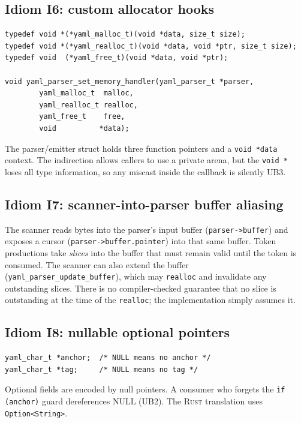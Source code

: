 \documentclass[12pt]{article}
\newcommand{\rust}{\textnormal{\textsc{Rust}}}
\theoremstyle{definition}
\theoremstyle{remark}
\begin{document}
\subsection{Idiom I6: custom allocator hooks}
\label{idiom:alloc}
\begin{lstlisting}[style=cstyle]
typedef void *(*yaml_malloc_t)(void *data, size_t size);
typedef void *(*yaml_realloc_t)(void *data, void *ptr, size_t size);
typedef void  (*yaml_free_t)(void *data, void *ptr);

void yaml_parser_set_memory_handler(yaml_parser_t *parser,
        yaml_malloc_t  malloc,
        yaml_realloc_t realloc,
        yaml_free_t    free,
        void          *data);
\end{lstlisting}
The parser/emitter struct holds three function pointers and a \texttt{void *data} context. The indirection allows callers to use a private arena, but the \texttt{void *} loses all type information, so any miscast inside the callback is silently UB3.

\subsection{Idiom I7: scanner-into-parser buffer aliasing}
\label{idiom:alias}
The scanner reads bytes into the parser's input buffer (\texttt{parser->buffer}) and exposes a cursor (\texttt{parser->buffer.pointer}) into that same buffer. Token productions take \emph{slices} into the buffer that must remain valid until the token is consumed. The scanner can also extend the buffer (\texttt{yaml\_parser\_update\_buffer}), which may \texttt{realloc} and invalidate any outstanding slices. There is no compiler-checked guarantee that no slice is outstanding at the time of the \texttt{realloc}; the implementation simply assumes it.

\subsection{Idiom I8: nullable optional pointers}
\label{idiom:null}
\begin{lstlisting}[style=cstyle]
yaml_char_t *anchor;  /* NULL means no anchor */
yaml_char_t *tag;     /* NULL means no tag */
\end{lstlisting}
Optional fields are encoded by null pointers. A consumer who forgets the \texttt{if (anchor)} guard dereferences NULL (UB2). The \rust{} translation uses \texttt{Option<String>}.
\end{document}
